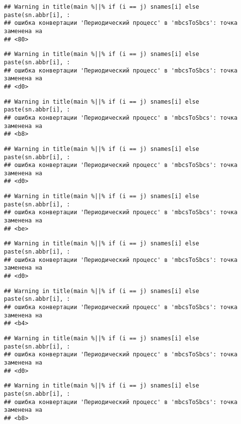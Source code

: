 \documentclass[
]{article}
\begin{document}
\begin{verbatim}
## Warning in title(main %||% if (i == j) snames[i] else paste(sn.abbr[i], :
## ошибка конвертации 'Периодический процесс' в 'mbcsToSbcs': точка заменена на
## <80>
\end{verbatim}

\begin{verbatim}
## Warning in title(main %||% if (i == j) snames[i] else paste(sn.abbr[i], :
## ошибка конвертации 'Периодический процесс' в 'mbcsToSbcs': точка заменена на
## <d0>
\end{verbatim}

\begin{verbatim}
## Warning in title(main %||% if (i == j) snames[i] else paste(sn.abbr[i], :
## ошибка конвертации 'Периодический процесс' в 'mbcsToSbcs': точка заменена на
## <b8>
\end{verbatim}

\begin{verbatim}
## Warning in title(main %||% if (i == j) snames[i] else paste(sn.abbr[i], :
## ошибка конвертации 'Периодический процесс' в 'mbcsToSbcs': точка заменена на
## <d0>
\end{verbatim}

\begin{verbatim}
## Warning in title(main %||% if (i == j) snames[i] else paste(sn.abbr[i], :
## ошибка конвертации 'Периодический процесс' в 'mbcsToSbcs': точка заменена на
## <be>
\end{verbatim}

\begin{verbatim}
## Warning in title(main %||% if (i == j) snames[i] else paste(sn.abbr[i], :
## ошибка конвертации 'Периодический процесс' в 'mbcsToSbcs': точка заменена на
## <d0>
\end{verbatim}

\begin{verbatim}
## Warning in title(main %||% if (i == j) snames[i] else paste(sn.abbr[i], :
## ошибка конвертации 'Периодический процесс' в 'mbcsToSbcs': точка заменена на
## <b4>
\end{verbatim}

\begin{verbatim}
## Warning in title(main %||% if (i == j) snames[i] else paste(sn.abbr[i], :
## ошибка конвертации 'Периодический процесс' в 'mbcsToSbcs': точка заменена на
## <d0>
\end{verbatim}

\begin{verbatim}
## Warning in title(main %||% if (i == j) snames[i] else paste(sn.abbr[i], :
## ошибка конвертации 'Периодический процесс' в 'mbcsToSbcs': точка заменена на
## <b8>
\end{verbatim}
\end{document}
